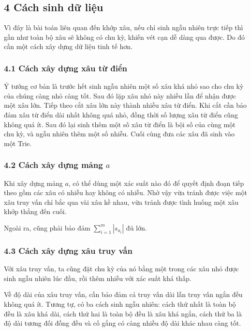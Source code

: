 \documentclass[11pt]{article}
\begin{document}
\subsection*{4 Cách sinh dữ liệu}

Vì đây là bài toán liên quan đến khớp xâu, nếu chỉ sinh ngẫu nhiên trực tiếp
thì gần như toàn bộ xâu sẽ không có chu kỳ, khiến vét cạn dễ dàng qua được. Do
đó cần một cách xây dựng dữ liệu tinh tế hơn.

\subsubsection*{4.1 Cách xây dựng xâu từ điển}

Ý tưởng cơ bản là trước hết sinh ngẫu nhiên một số xâu khá nhỏ sao cho chu kỳ
của chúng càng nhỏ càng tốt. Sau đó lặp xâu nhỏ này nhiều lần để nhận được một
xâu lớn. Tiếp theo cắt xâu lớn này thành nhiều xâu từ điển. Khi cắt cần bảo
đảm xâu từ điển dài nhất không quá nhỏ, đồng thời số lượng xâu từ điển cũng
không quá ít. Sau đó lại sinh thêm một số xâu từ điển là bội số của cùng một
chu kỳ, và ngẫu nhiên thêm một số nhiễu. Cuối cùng đưa các xâu đã sinh vào một
Trie.

\subsubsection*{4.2 Cách xây dựng mảng \(a\)}

Khi xây dựng mảng \(a\), có thể dùng một xác suất nào đó để quyết định đoạn
tiếp theo gồm các xâu có nhiễu hay không có nhiễu. Nhờ vậy vừa tránh được việc
một xâu truy vấn chỉ bắc qua vài xâu kề nhau, vừa tránh được tình huống một xâu
khớp thẳng đến cuối.

Ngoài ra, cũng phải bảo đảm \(\sum_{i=1}^{m}|s_{a_i}|\) đủ lớn.

\subsubsection*{4.3 Cách xây dựng xâu truy vấn}

Với xâu truy vấn, ta cũng đặt chu kỳ của nó bằng một trong các xâu nhỏ được
sinh ngẫu nhiên lúc đầu, rồi thêm nhiễu với xác suất khá thấp.

Về độ dài của xâu truy vấn, cần bảo đảm cả truy vấn dài lẫn truy vấn ngắn đều
không quá ít. Tương tự, có ba cách sinh ngẫu nhiên: cách thứ nhất là toàn bộ
đều là xâu khá dài, cách thứ hai là toàn bộ đều là xâu khá ngắn, cách thứ ba là
độ dài tương đối đồng đều và cố gắng có càng nhiều độ dài khác nhau càng tốt.
\end{document}
